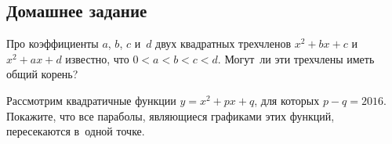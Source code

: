 \subsection*{Домашнее задание}

\begin{problems}

\item
Про коэффициенты $a$, $b$, $c$ и~$d$ двух квадратных трехчленов
$x^2 + b x + c$ и~$x^2 + a x + d$ известно, что $0 < a < b < c < d$.
Могут~ли эти трехчлены иметь общий корень?

\item
Рассмотрим квадратичные функции $y = x^2 + p x + q$, для которых
$p - q = 2016$.
Покажите, что все параболы, являющиеся графиками этих функций, пересекаются
в~одной точке.

\end{problems}

